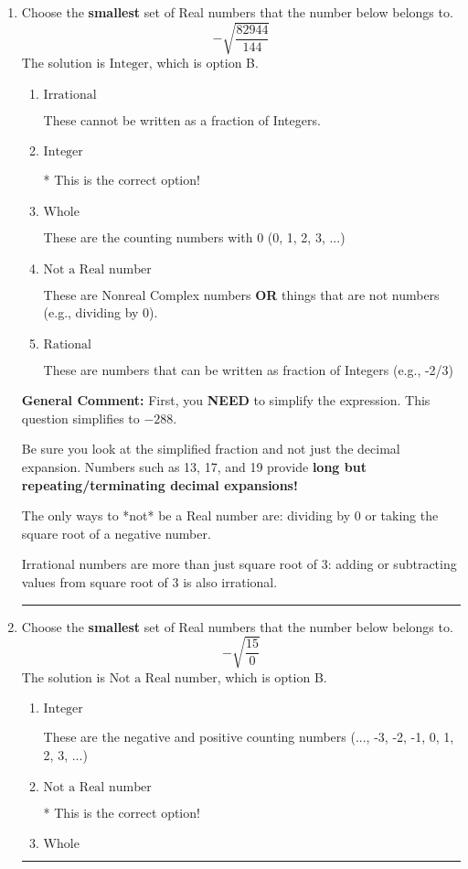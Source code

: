 \documentclass{extbook}[14pt]
\newcommand{\litem}[1]{\item #1

\rule{\textwidth}{0.4pt}}
\begin{document}
\begin{enumerate}\litem{
Choose the \textbf{smallest} set of Real numbers that the number below belongs to.
\[ -\sqrt{\frac{82944}{144}} \]The solution is \( \text{Integer} \), which is option B.\begin{enumerate}[label=\Alph*.]
\item \( \text{Irrational} \)

These cannot be written as a fraction of Integers.
\item \( \text{Integer} \)

* This is the correct option!
\item \( \text{Whole} \)

These are the counting numbers with 0 (0, 1, 2, 3, ...)
\item \( \text{Not a Real number} \)

These are Nonreal Complex numbers \textbf{OR} things that are not numbers (e.g., dividing by 0).
\item \( \text{Rational} \)

These are numbers that can be written as fraction of Integers (e.g., -2/3)
\end{enumerate}

\textbf{General Comment:} First, you \textbf{NEED} to simplify the expression. This question simplifies to $-288$. 
 
 Be sure you look at the simplified fraction and not just the decimal expansion. Numbers such as 13, 17, and 19 provide \textbf{long but repeating/terminating decimal expansions!} 
 
 The only ways to *not* be a Real number are: dividing by 0 or taking the square root of a negative number. 
 
 Irrational numbers are more than just square root of 3: adding or subtracting values from square root of 3 is also irrational.
}
\litem{
Choose the \textbf{smallest} set of Real numbers that the number below belongs to.
\[ -\sqrt{\frac{15}{0}} \]The solution is \( \text{Not a Real number} \), which is option B.\begin{enumerate}[label=\Alph*.]
\item \( \text{Integer} \)

These are the negative and positive counting numbers (..., -3, -2, -1, 0, 1, 2, 3, ...)
\item \( \text{Not a Real number} \)

* This is the correct option!
\item \( \text{Whole} \)


\end{enumerate}}
\end{enumerate}
\end{document}
